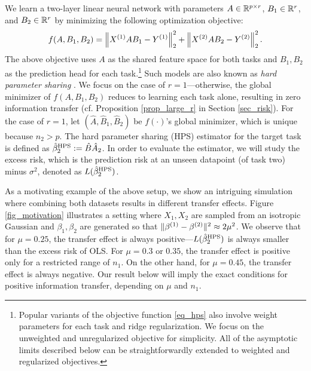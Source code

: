 We learn a two-layer linear neural network with parameters $A \in \mathbb{R}^{p\times r}$, $B_1 \in \mathbb{R}^{r}$, and $B_2 \in \mathbb{R}^r$ by minimizing the following optimization objective:
\begin{align}\label{eq_hps}
    f(A, B_1, B_2) = \bignorm{X^{(1)} A B_1 - Y^{(1)}}_2^2 + \bignorm{X^{(2)} A B_2 - Y^{(2)}}_2^2.
\end{align}
The above objective uses $A$ as the shared feature space for both tasks and $B_1, B_2$ as the prediction head for each task.\footnote{Popular variants of the objective function \eqref{eq_hps} also involve weight parameters for each task and ridge regularization. We focus on the unweighted and unregularized objective for simplicity. All of the asymptotic limits described below can be straightforwardly extended to weighted and regularized objectives.}
Such models are also known as \textit{hard parameter sharing} \cite{C97,R17}.
We focus on the case of $r = 1$---otherwise, the global minimizer of $f(A, B_1, B_2)$ reduces to learning each task alone, resulting in zero information transfer (cf. Proposition \ref{prop_large_r} in Section \ref{sec_risk}).
For the case of $r = 1$, let $(\hat{A}, \hat{B}_1, \hat{B}_2)$ be $f(\cdot)$'s global minimizer, which is unique because $n_2 > p$.
The hard parameter sharing (HPS) estimator for the target task is defined as $\hat{\beta}_2^{\textup{HPS}} := \hat{B} \hat{A}_2$.
In order to evaluate the estimator, we will study the excess risk, which is the prediction risk at an unseen datapoint (of task two) minus $\sigma^2$, denoted as $L(\hat{\beta}_2^{\textup{HPS}})$.

As a motivating example of the above setup, we show an intriguing simulation where combining both datasets results in different transfer effects.
Figure \ref{fig_motivation} illustrates a setting where $X_1, X_2$ are sampled from an isotropic Gaussian and $\beta_1,\beta_2$ are generated so that $\|\beta^{(1)} - \beta^{(2)}\|^2 \approx 2\mu^2$.
We observe that for $\mu = 0.25$, the transfer effect is always positive---$L(\hat{\beta}_2^{\textup{HPS}})$ is always smaller than the excess risk of OLS.
For $\mu = 0.3$ or $0.35$, the transfer effect is positive only for a restricted range of $n_1$.
On the other hand, for $\mu = 0.45$, the transfer effect is always negative.  
Our result below will imply the exact conditions for positive information transfer, depending on $\mu$ and $n_1$.


